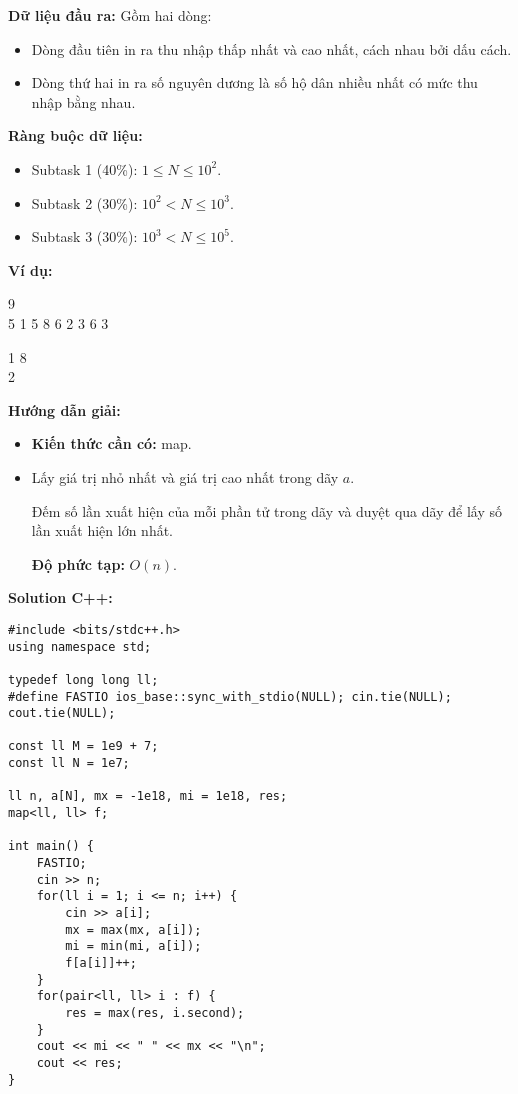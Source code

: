 \documentclass[12pt]{scrartcl}  %
\begin{document}
\textbf{Dữ liệu đầu ra:}
Gồm hai dòng:

\begin{itemize}
    \item Dòng đầu tiên in ra thu nhập thấp nhất và cao nhất, cách nhau bởi dấu cách.
    \item Dòng thứ hai in ra số nguyên dương là số hộ dân nhiều nhất có mức thu nhập bằng nhau.
\end{itemize}

\textbf{Ràng buộc dữ liệu:}
\begin{itemize}
    \item Subtask 1 (40\%): $1 \leq N \leq 10^2$.
    \item Subtask 2 (30\%): $10^2 < N \leq 10^3$.
    \item Subtask 3 (30\%): $10^3 < N \leq 10^5$.
\end{itemize}

\textbf{Ví dụ:}
\begin{tcolorbox}[colback=gray!5!white, colframe=blue!50!black, title=Input]
9\\
5 1 5 8 6 2 3 6 3
\end{tcolorbox}
\begin{tcolorbox}[colback=gray!5!white, colframe=green!50!black, title=Output]
1 8\\
2
\end{tcolorbox}
\textbf{Hướng dẫn giải:}
\begin{itemize}
    \item \textbf{Kiến thức cần có:} map.
    \item Lấy giá trị nhỏ nhất và giá trị cao nhất trong dãy $a$.
    
    
    Đếm số lần xuất hiện của mỗi phần tử trong dãy và duyệt qua dãy để lấy số lần xuất hiện lớn nhất.
    
    \textbf{Độ phức tạp:} $O(n)$.
\end{itemize}


\textbf{Solution C++:}
\begin{lstlisting}
#include <bits/stdc++.h>
using namespace std;

typedef long long ll;
#define FASTIO ios_base::sync_with_stdio(NULL); cin.tie(NULL); cout.tie(NULL);

const ll M = 1e9 + 7;
const ll N = 1e7;

ll n, a[N], mx = -1e18, mi = 1e18, res;
map<ll, ll> f;

int main() {
    FASTIO;
    cin >> n;
    for(ll i = 1; i <= n; i++) {
        cin >> a[i];
        mx = max(mx, a[i]);
        mi = min(mi, a[i]);
        f[a[i]]++;
    }
    for(pair<ll, ll> i : f) {
        res = max(res, i.second);
    }
    cout << mi << " " << mx << "\n";
    cout << res;
}

\end{lstlisting}
\end{document}
